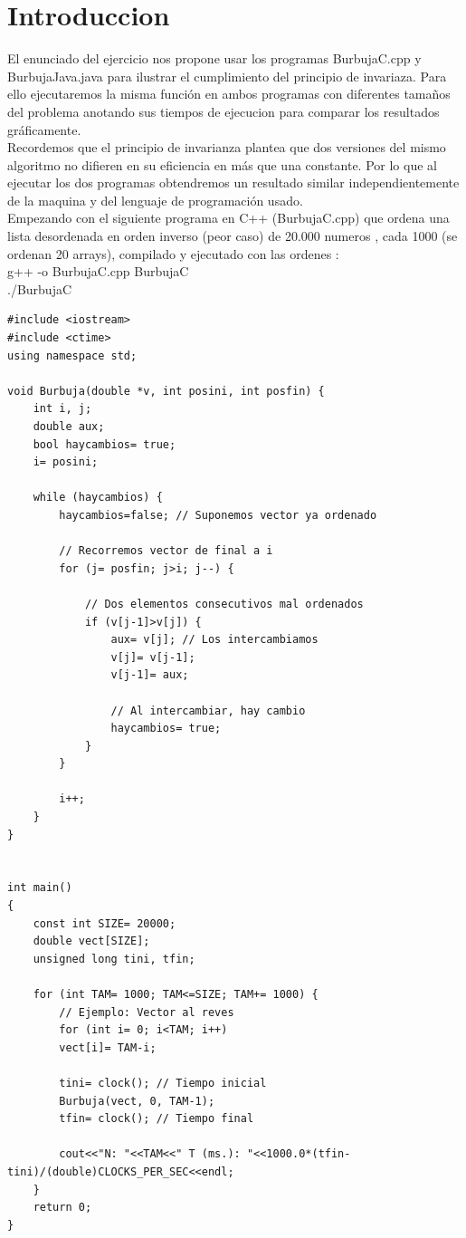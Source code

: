 	\listoftables %
	
	\newpage
	
	\section[Introduccion]{Introduccion}
		
	El enunciado del ejercicio nos propone usar los programas BurbujaC.cpp y BurbujaJava.java para ilustrar el cumplimiento del principio de invariaza. Para ello ejecutaremos la misma función en ambos programas con diferentes tamaños del problema anotando sus tiempos de ejecucion para comparar los resultados gráficamente. \\
	
	Recordemos que el principio de invarianza plantea que dos versiones del mismo algoritmo no difieren en su eficiencia en más que una constante. Por lo que al ejecutar los dos programas obtendremos un resultado similar independientemente de la maquina y del lenguaje de programación usado.\\ 
	
	Empezando con el siguiente programa en C++ (BurbujaC.cpp) que ordena una lista desordenada en orden inverso (peor caso) de 20.000 numeros , cada 1000 (se ordenan 20 arrays), compilado y ejecutado con las ordenes : \\
	
	g++ -o BurbujaC.cpp BurbujaC\\
	./BurbujaC
	
	\lstset{language=C}
	\begin{lstlisting}[frame=single] 
#include <iostream>
#include <ctime>
using namespace std;

void Burbuja(double *v, int posini, int posfin) {
	int i, j;
	double aux;
	bool haycambios= true;	
	i= posini;
	
	while (haycambios) {	
		haycambios=false; // Suponemos vector ya ordenado
		
		// Recorremos vector de final a i
		for (j= posfin; j>i; j--) {
		
			// Dos elementos consecutivos mal ordenados
			if (v[j-1]>v[j]) {
				aux= v[j]; // Los intercambiamos
				v[j]= v[j-1];
				v[j-1]= aux;
				
				// Al intercambiar, hay cambio
				haycambios= true;
			}
		}
		
		i++;
	}
}


int main()
{
	const int SIZE= 20000;
	double vect[SIZE];
	unsigned long tini, tfin;
	
	for (int TAM= 1000; TAM<=SIZE; TAM+= 1000) {	
		// Ejemplo: Vector al reves
		for (int i= 0; i<TAM; i++)
		vect[i]= TAM-i;
		
		tini= clock(); // Tiempo inicial
		Burbuja(vect, 0, TAM-1);
		tfin= clock(); // Tiempo final
		
		cout<<"N: "<<TAM<<" T (ms.): "<<1000.0*(tfin-tini)/(double)CLOCKS_PER_SEC<<endl;
	}
	return 0;
}
	\end{lstlisting}
	
